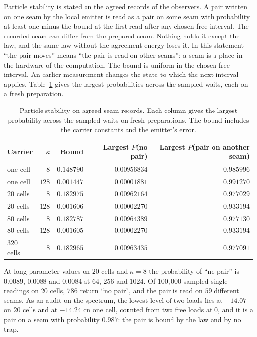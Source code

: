 Particle stability is stated on the agreed records of the observers. A pair written on
one seam by the local emitter is read as a pair on some seam with probability at least one
minus the bound at the first read after any chosen free interval. The recorded seam can differ from the prepared seam. Nothing holds
it except the law, and the same law without the agreement energy loses it. In this
statement ``the pair moves'' means ``the pair is read on other seams''; a seam is a place
in the hardware of the computation. The bound is uniform in the chosen free interval. An earlier measurement
changes the state to which the next interval applies.
Table~\ref{tab:cms-stability} gives the largest probabilities across the
sampled waits, each on a fresh preparation.

\begin{table}[htbp]
\centering\small
\caption{Particle stability on agreed seam records. Each column gives the largest probability across
the sampled waits on fresh preparations. The bound includes the carrier
constants and the emitter's error.}
\label{tab:cms-stability}
\begin{tabular}{@{}lrrrr@{}}
\toprule
Carrier & $\kappa$ & Bound & Largest $P$(no pair) & Largest $P$(pair on another seam)\\
\midrule
one cell & $8$ & $0.148790$ & $0.00956834$ & $0.985996$\\
one cell & $128$ & $0.001447$ & $0.00001881$ & $0.991270$\\
$20$ cells & $8$ & $0.182975$ & $0.00962164$ & $0.977029$\\
$20$ cells & $128$ & $0.001606$ & $0.00002270$ & $0.933194$\\
$80$ cells & $8$ & $0.182787$ & $0.00964389$ & $0.977130$\\
$80$ cells & $128$ & $0.001605$ & $0.00002270$ & $0.933194$\\
$320$ cells & $8$ & $0.182965$ & $0.00963435$ & $0.977091$\\
\bottomrule
\end{tabular}
\end{table}

At long parameter values on $20$ cells and $\kappa=8$ the probability of ``no pair'' is
$0.0089$, $0.0088$ and $0.0084$ at $64$, $256$ and $1024$. Of $100{,}000$ sampled single
readings on $20$ cells, $786$ return ``no pair'', and the pair is read on $59$ different
seams. As an audit on the spectrum, the lowest level of two loads lies at $-14.07$ on $20$
cells and at $-14.24$ on one cell, counted from two free loads at $0$, and it is a pair on a
seam with probability $0.987$: the pair is bound by the law and by no trap.

